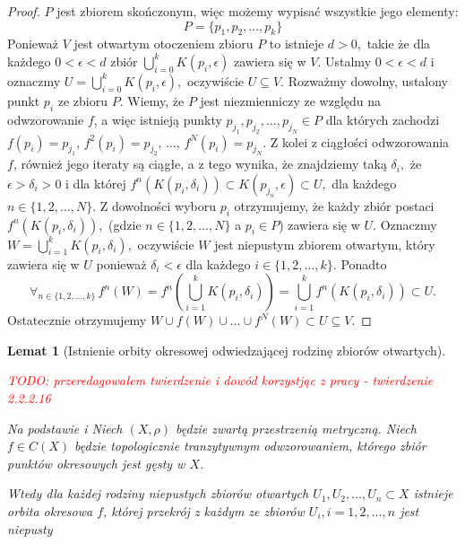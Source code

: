 \documentclass[licencjacka]{pwr_wmat_praca_dyplomowa}
\theoremstyle{plain}
\numberwithin{theorem}{chapter}
\newtheorem{lemma}[theorem]{Lemat}
\theoremstyle{definition}
\numberwithin{theorem}{chapter}
\begin{document}
\begin{proof}
$P$ jest zbiorem skończonym, więc możemy wypisać wszystkie jego elementy: 
$$P = \{p_1, p_2, \ldots, p_k\}$$
Ponieważ $V$ jest otwartym otoczeniem zbioru $P$ to istnieje $d>0,$ takie że dla każdego ${0<\epsilon<d}$ zbiór $\bigcup_{i=0}^k K(p_i, \epsilon)$ zawiera się w $V.$ Ustalmy $0<\epsilon<d$ i oznaczmy $U=\bigcup_{i=0}^k K(p_i, \epsilon),$ oczywiście $U \subseteq V.$ Rozważmy dowolny, ustalony punkt $p_i$ ze zbioru $P.$ Wiemy, że $P$ jest niezmienniczy ze względu na odwzorowanie $f$, a więc istnieją punkty $p_{j_1}, p_{j_2}, \ldots, p_{j_N} \in P$ dla których zachodzi $f(p_i) = p_{j_1}, \, f^2(p_i) = p_{j_2}, \, \ldots, \, f^N(p_i) = p_{j_N}.$ Z kolei z ciągłości odwzorowania $f$, również jego iteraty są ciągłe, a z tego wynika, że znajdziemy taką $\delta_i,$ że $\epsilon >\delta_i > 0$ i dla której $f^n(K(p_i, \delta_i)) \subset K(p_{j_n}, \epsilon) \subset U,$ dla każdego $n \in \{1,2,\ldots,N\}.$ Z dowolności wyboru $p_i$ otrzymujemy, że każdy zbiór postaci $f^n(K(p_i, \delta_i)),$ (gdzie $n \in \{1,2,\ldots,N\}$ a $p_i \in P$) zawiera się w $U$. Oznaczmy $W = \bigcup_{i=1}^k K(p_i, \delta_i),$ oczywiście $W$ jest niepustym zbiorem otwartym, który zawiera się w $U$ ponieważ $\delta_i < \epsilon$ dla każdego $i \in \{1,2,\ldots,k\}.$ Ponadto
$$\forall_{n \in \{1,2,\ldots,k\}} \, f^n(W) = f^n(\bigcup_{i=1}^k K(p_i, \delta_i)) = \bigcup_{i=1}^k f^n(K(p_i, \delta_i)) \subset U.$$
Ostatecznie otrzymujemy $W \cup f(W) \cup \ldots \cup f^N(W) \subset U \subseteq V.$
\end{proof}



\begin{lemma}[Istnienie orbity okresowej odwiedzającej rodzinę zbiorów otwartych]
\label{lemat_3_glownego_artykulu_istnieje_orbita_okresowa_krojaca_sie_z_rodzina_otwartych}

\textcolor{red}{TODO: przeredagowałem twierdzenie i dowód korzystjąc z pracy \cite[s.~7]{someAspectsOfTopologicalTransitivity} - twierdzenie 2.2.2.16}

Na podstawie \cite[s.~231-232 Lemma 3]{balibrea2003topological} i \cite[s.~7]{someAspectsOfTopologicalTransitivity}
Niech $(X, \rho)$ będzie zwartą przestrzenią metryczną.
Niech $f \in C(X)$ będzie topologicznie tranzytywnym odwzorowaniem, którego zbiór punktów okresowych jest gęsty w $X$. 

Wtedy dla każdej rodziny niepustych zbiorów otwartych $U_1, U_2, \ldots, U_n \subset X$ istnieje orbita okresowa $f$, której przekrój z każdym ze zbiorów $U_i, i=1,2,\ldots,n$ jest niepusty
\end{lemma}
\end{document}
